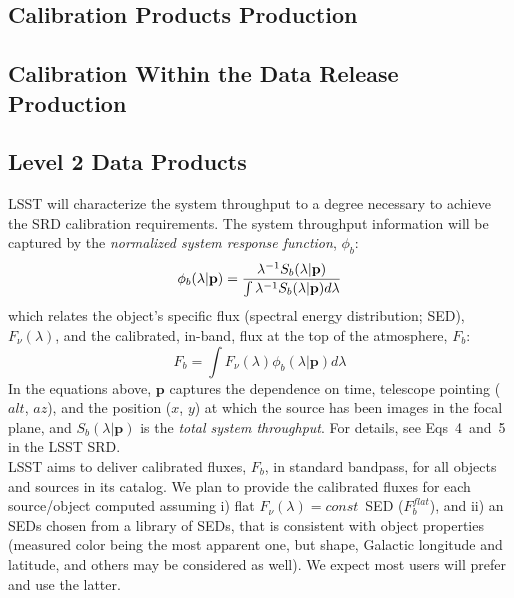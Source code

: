 \documentclass[12pt,preprint]{aastex}
\begin{document}
\subsection{Calibration Products Production}

\subsection{Calibration Within the Data Release Production}

\subsection{Level 2 Data Products}

LSST will characterize the system throughput to a degree necessary to achieve the SRD calibration requirements. The system throughput information will be captured by the {\em normalized system response function}, $\phi_b$:
%
\begin{equation}
    \phi_b(\lambda|\mathbf{p}) = {\lambda^{-1} S_b(\lambda|\mathbf{p}) \over \int \lambda^{-1} S_b(\lambda|\mathbf{p}) d\lambda}
\end{equation}
%
which relates the object's specific flux (spectral energy distribution; SED), $F_\nu(\lambda)$, and the calibrated, in-band, flux at the top of the atmosphere, $F_b$:
%
\begin{equation}
    F_b = \int F_\nu(\lambda) \phi_b(\lambda|\mathbf{p}) d\lambda
\end{equation}
In the equations above, $\mathbf{p}$ captures the dependence on time, telescope pointing ($alt$, $az$), and the position ($x$, $y$) at which the source has been images in the focal plane, and $S_b(\lambda|\mathbf{p})$ is the {\em total system throughput}. For details, see Eqs~4~and~5 in the LSST SRD.
\\

LSST aims to deliver calibrated fluxes, $F_b$, in standard bandpass, for all objects and sources in its catalog. We plan to provide the calibrated fluxes for each source/object computed assuming i) flat $F_\nu(\lambda) = const\,$ SED ($F_b^{flat}$), and ii) an SEDs chosen from a library of SEDs, that is consistent with object properties (measured color being the most apparent one, but shape, Galactic longitude and latitude, and others may be considered as well). We expect most users will prefer and use the latter.
\end{document}
